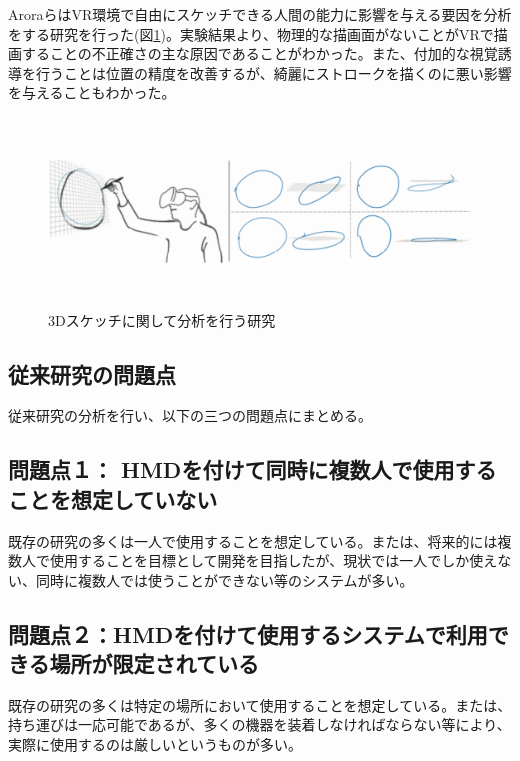 \documentclass[11pt,a4j, titlepage]{jarticle} %
\begin{document}
Aroraら\cite{arora}はVR環境で自由にスケッチできる人間の能力に影響を与える要因を分析をする研究を行った(図\ref{fig:evaluation_sketch})。実験結果より、物理的な描画面がないことがVRで描画することの不正確さの主な原因であることがわかった。また、付加的な視覚誘導を行うことは位置の精度を改善するが、綺麗にストロークを描くのに悪い影響を与えることもわかった。

\begin{figure}[H]
  \begin{center}
    \includegraphics[clip,height=5.0cm,width=15.0cm]{./evaluation_sketch.eps}
    \caption{3Dスケッチに関して分析を行う研究}
    \label{fig:evaluation_sketch}
  \end{center}
\end{figure}

\subsection{従来研究の問題点} \label{mondaiten}
従来研究の分析を行い、以下の三つの問題点にまとめる。

\subsection*{問題点１： HMDを付けて同時に複数人で使用することを想定していない}
既存の研究の多くは一人で使用することを想定している。または、将来的には複数人で使用することを目標として開発を目指したが、現状では一人でしか使えない、同時に複数人では使うことができない等のシステムが多い。

\subsection*{問題点２：HMDを付けて使用するシステムで利用できる場所が限定されている}
既存の研究の多くは特定の場所において使用することを想定している。または、持ち運びは一応可能であるが、多くの機器を装着しなければならない等により、実際に使用するのは厳しいというものが多い。
\end{document}
